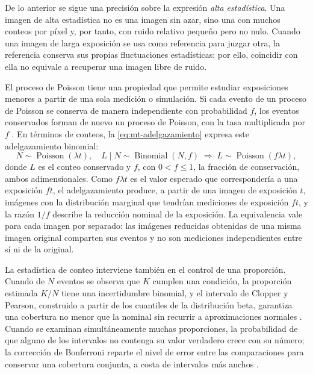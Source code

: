 De lo anterior se sigue una precisión sobre la expresión \emph{alta estadística}. Una imagen de alta estadística no es una imagen sin azar, sino una con muchos conteos por píxel y, por tanto, con ruido relativo pequeño pero no nulo. Cuando una imagen de larga exposición se usa como referencia para juzgar otra, la referencia conserva sus propias fluctuaciones estadísticas; por ello, coincidir con ella no equivale a recuperar una imagen libre de ruido.

El proceso de Poisson tiene una propiedad que permite estudiar exposiciones menores a partir de una sola medición o simulación. Si cada evento de un proceso de Poisson se conserva de manera independiente con probabilidad $f$, los eventos conservados forman de nuevo un proceso de Poisson, con la tasa multiplicada por $f$ \parencite{kingman1992}. En términos de conteos, la \cref{eq:mt-adelgazamiento} expresa este adelgazamiento binomial:
\begin{equation}\label{eq:mt-adelgazamiento}
N\sim\operatorname{Poisson}(\lambda t),\quad L\mid N\sim\operatorname{Binomial}(N,f)\;\Longrightarrow\;L\sim\operatorname{Poisson}(f\lambda t),
\end{equation}
donde $L$ es el conteo conservado y $f$, con $0<f\le1$, la fracción de conservación, ambos adimensionales. Como $f\lambda t$ es el valor esperado que correspondería a una exposición $ft$, el adelgazamiento produce, a partir de una imagen de exposición $t$, imágenes con la distribución marginal que tendrían mediciones de exposición $ft$, y la razón $1/f$ describe la reducción nominal de la exposición. La equivalencia vale para cada imagen por separado: las imágenes reducidas obtenidas de una misma imagen original comparten sus eventos y no son mediciones independientes entre sí ni de la original.

La estadística de conteo interviene también en el control de una proporción. Cuando de $N$ eventos se observa que $K$ cumplen una condición, la proporción estimada $K/N$ tiene una incertidumbre binomial, y el intervalo de Clopper y Pearson, construido a partir de los cuantiles de la distribución beta, garantiza una cobertura no menor que la nominal sin recurrir a aproximaciones normales \parencite{clopper1934}. Cuando se examinan simultáneamente muchas proporciones, la probabilidad de que alguno de los intervalos no contenga su valor verdadero crece con su número; la corrección de Bonferroni reparte el nivel de error entre las comparaciones para conservar una cobertura conjunta, a costa de intervalos más anchos \parencite{dunn1961}.


